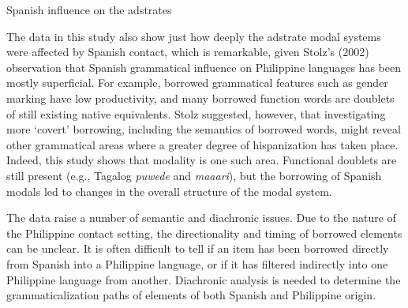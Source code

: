 \setcounter{listWWNumiiileveli}{0}
\begin{listWWNumiiileveli}
\item 

\setcounter{listWWNumiiilevelii}{0}
\begin{listWWNumiiilevelii}
\item 
\begin{stylelsSectionii}
Spanish influence on the adstrates
\end{stylelsSectionii}
\end{listWWNumiiilevelii}
\end{listWWNumiiileveli}
\begin{styleStandard}
The data in this study also show just how deeply the adstrate modal systems were affected by Spanish contact, which is remarkable, given Stolz's (2002) observation that Spanish grammatical influence on Philippine languages has been mostly superficial. For example, borrowed grammatical features such as gender marking have low productivity, and many borrowed function words are doublets of still existing native equivalents. Stolz suggested, however, that investigating more ‘covert’ borrowing, including the semantics of borrowed words, might reveal other grammatical areas where a greater degree of hispanization has taken place. Indeed, this study shows that modality is one such area. Functional doublets are still present (e.g., Tagalog \textit{puwede} and \textit{maaari}), but the borrowing of Spanish modals led to changes in the overall structure of the modal system.
\end{styleStandard}

\begin{styleStandard}
The data raise a number of semantic and diachronic issues. Due to the nature of the Philippine contact setting, the directionality and timing of borrowed elements can be unclear. It is often difficult to tell if an item has been borrowed directly from Spanish into a Philippine language, or if it has filtered indirectly into one Philippine language from another. Diachronic analysis is needed to determine the grammaticalization paths of elements of both Spanish and Philippine origin. 
\end{styleStandard}

